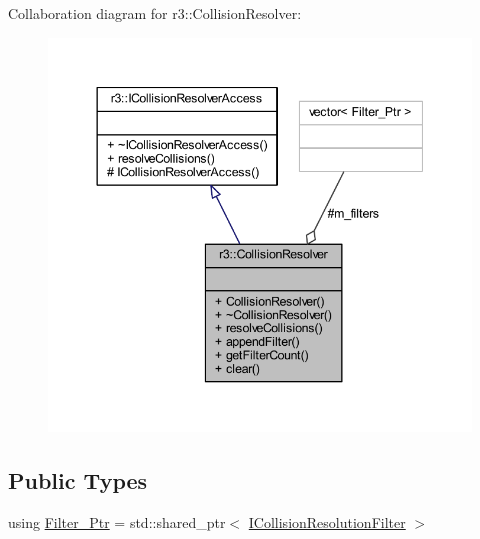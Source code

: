Collaboration diagram for r3\+:\+:Collision\+Resolver\+:\nopagebreak
\begin{figure}[H]
\begin{center}
\leavevmode
\includegraphics[width=344pt]{classr3_1_1_collision_resolver__coll__graph}
\end{center}
\end{figure}
\subsection*{Public Types}
\begin{DoxyCompactItemize}
\item 
using \mbox{\hyperlink{classr3_1_1_collision_resolver_a5b3838b81de7909c3c78268801d61414}{Filter\+\_\+\+Ptr}} = std\+::shared\+\_\+ptr$<$ \mbox{\hyperlink{classr3_1_1_i_collision_resolution_filter}{I\+Collision\+Resolution\+Filter}} $>$
\end{DoxyCompactItemize}
